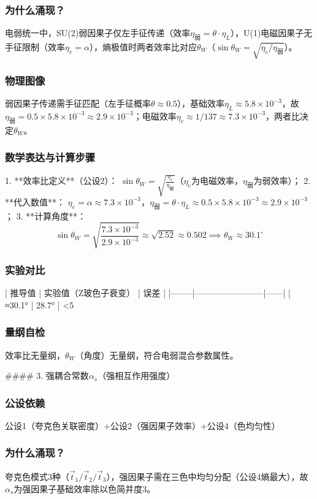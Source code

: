 \documentclass{article}
\begin{document}
\subsubsection{为什么涌现？}
电弱统一中，SU(2)弱因果子仅左手征传递（效率\(\eta_{\text{弱}} = \theta·\eta_L\)），U(1)电磁因果子无手征限制（效率\(\eta_e = \alpha\)），熵极值时两者效率比对应\(\theta_W\)（\(\sin\theta_W = \sqrt{\eta_e/\eta_{\text{弱}}}\)）。

\subsubsection{物理图像}
弱因果子传递需手征匹配（左手征概率\(\theta≈0.5\)），基础效率\(\eta_L≈5.8×10^{-3}\)，故\(\eta_{\text{弱}} = 0.5×5.8×10^{-3}≈2.9×10^{-3}\)；电磁效率\(\eta_e≈1/137≈7.3×10^{-3}\)，两者比决定\(\theta_W\)。

\subsubsection{数学表达与计算步骤}
1. **效率比定义**（公设2）：  
   \(\sin\theta_W = \sqrt{\frac{\eta_e}{\eta_{\text{弱}}}}\)（\(\eta_e\)为电磁效率，\(\eta_{\text{弱}}\)为弱效率）；  
2. **代入数值**：  
   \(\eta_e = \alpha≈7.3×10^{-3}\)，\(\eta_{\text{弱}} = \theta·\eta_L≈0.5×5.8×10^{-3}≈2.9×10^{-3}\)；  
3. **计算角度**：  
   \[
   \sin\theta_W = \sqrt{\frac{7.3×10^{-3}}{2.9×10^{-3}}}≈\sqrt{2.52}≈0.502 \implies \theta_W≈30.1^\circ
   \]

\subsubsection{实验对比}
| 推导值 | 实验值（Z玻色子衰变） | 误差 |
|--------|------------------------|------|
| ≈30.1° | 28.7° | <5%

\subsubsection{量纲自检}
效率比无量纲，\(\theta_W\)（角度）无量纲，符合电弱混合参数属性。


#### 3. 强耦合常数\(\alpha_s\)（强相互作用强度）
\subsubsection{公设依赖}
公设1（夸克色关联密度）+公设2（强因果子效率）+公设4（色均匀性）

\subsubsection{为什么涌现？}
夸克色模式3种（\(\vec{t}_1/\vec{t}_2/\vec{t}_3\)），强因果子需在三色中均匀分配（公设4熵最大），故\(\alpha_s\)为强因果子基础效率除以色简并度3。
\end{document}
